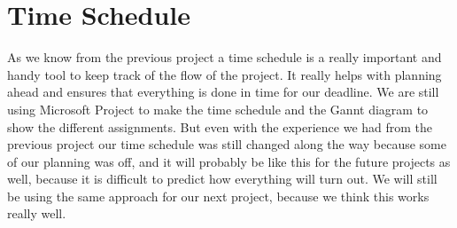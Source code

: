 \section{Time Schedule}
As we know from the previous project a time schedule is a really important and handy tool to keep track of the flow of the project. It really helps with planning ahead and ensures that everything is done in time for our deadline. We are still using Microsoft Project to make the time schedule and the Gannt diagram to show the different assignments. But even with the experience we had from the previous project our time schedule was still changed along the way because some of our planning was off, and it will probably be like this for the future projects as well, because it is difficult to predict how everything will turn out.
We will still be using the same approach for our next project, because we think this works really well.
